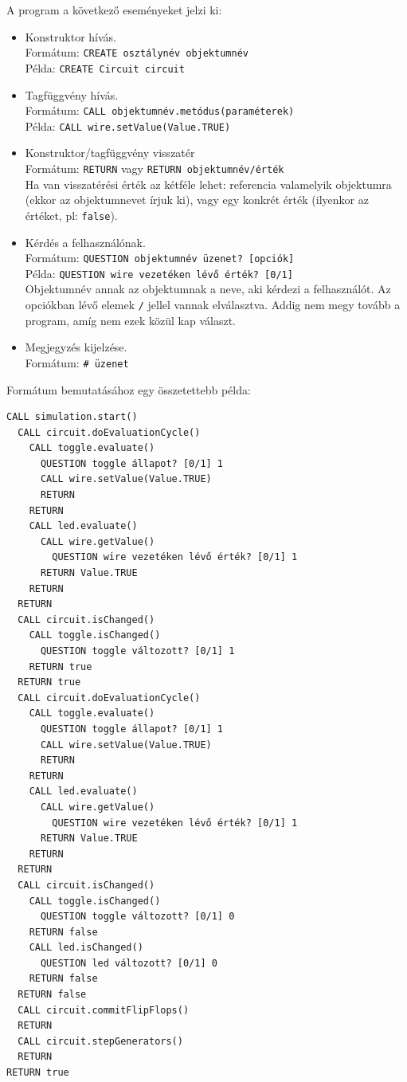 A program a következő eseményeket jelzi ki:
\begin{itemize}
\item Konstruktor hívás.\\
	  Formátum: \texttt{CREATE osztálynév objektumnév}\\
	  Példa: \texttt{CREATE Circuit circuit}
\item Tagfüggvény hívás.\\
	  Formátum: \texttt{CALL objektumnév.metódus(paraméterek)}\\
	  Példa: \texttt{CALL wire.setValue(Value.TRUE)}
\item Konstruktor/tagfüggvény visszatér\\
	  Formátum: \texttt{RETURN} vagy \texttt{RETURN objektumnév/érték}\\
	  Ha van visszatérési érték az kétféle lehet: referencia valamelyik objektumra (ekkor az objektumnevet írjuk ki), vagy egy konkrét érték (ilyenkor az értéket, pl: \texttt{false}).
\item Kérdés a felhasználónak.\\
	  Formátum: \texttt{QUESTION objektumnév üzenet? [opciók]}\\
	  Példa: \texttt{QUESTION wire vezetéken lévő érték? [0/1]}\\
	  Objektumnév annak az objektumnak a neve, aki kérdezi a felhasználót. Az opciókban lévő elemek \texttt{/} jellel vannak elválasztva. Addig nem megy tovább a program, amíg nem ezek közül kap választ.
\item Megjegyzés kijelzése.\\
	Formátum: \texttt{\# üzenet}
\end{itemize}

Formátum bemutatásához egy összetettebb példa:

\begin{verbatim}
CALL simulation.start()
  CALL circuit.doEvaluationCycle()
    CALL toggle.evaluate()
      QUESTION toggle állapot? [0/1] 1
      CALL wire.setValue(Value.TRUE)
      RETURN
    RETURN
    CALL led.evaluate()
      CALL wire.getValue()
        QUESTION wire vezetéken lévő érték? [0/1] 1
      RETURN Value.TRUE
    RETURN
  RETURN
  CALL circuit.isChanged()
    CALL toggle.isChanged()
      QUESTION toggle változott? [0/1] 1
    RETURN true
  RETURN true
  CALL circuit.doEvaluationCycle()
    CALL toggle.evaluate()
      QUESTION toggle állapot? [0/1] 1
      CALL wire.setValue(Value.TRUE)
      RETURN
    RETURN
    CALL led.evaluate()
      CALL wire.getValue()
        QUESTION wire vezetéken lévő érték? [0/1] 1
      RETURN Value.TRUE
    RETURN
  RETURN
  CALL circuit.isChanged()
    CALL toggle.isChanged()
      QUESTION toggle változott? [0/1] 0
    RETURN false
    CALL led.isChanged()
      QUESTION led változott? [0/1] 0
    RETURN false
  RETURN false
  CALL circuit.commitFlipFlops()
  RETURN
  CALL circuit.stepGenerators()
  RETURN
RETURN true
\end{verbatim}

